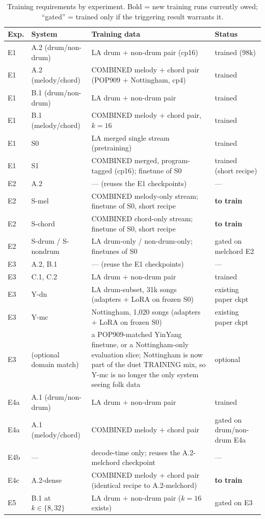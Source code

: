 \documentclass[11pt]{article}
\begin{document}
\begin{table}[ht]
\centering
\small
\begin{tabularx}{\textwidth}{@{}llLl@{}}
\toprule
Exp. & System & Training data & Status \\
\midrule
E1 & A.2 (drum/non-drum) & LA drum $+$ non-drum pair (cp16) & trained (98k) \\
E1 & A.2 (melody/chord) & COMBINED melody $+$ chord pair (POP909 $+$ Nottingham, cp4) & trained \\
E1 & B.1 (drum/non-drum) & LA drum $+$ non-drum pair & trained \\
E1 & B.1 (melody/chord) & COMBINED melody $+$ chord pair, $k{=}16$ & trained \\
E1 & S0 & LA merged single stream (pretraining) & trained \\
E1 & S1 & COMBINED merged, program-tagged (cp16); finetune of S0 & trained (short recipe) \\
\midrule
E2 & A.2 & --- (reuses the E1 checkpoints) & --- \\
E2 & S-mel & COMBINED melody-only stream; finetune of S0, short recipe & \textbf{to train} \\
E2 & S-chord & COMBINED chord-only stream; finetune of S0, short recipe & \textbf{to train} \\
E2 & S-drum / S-nondrum & LA drum-only / non-drum-only; finetunes of S0 & gated on melchord E2 \\
\midrule
E3 & A.2, B.1 & --- (reuse the E1 checkpoints) & --- \\
E3 & C.1, C.2 & LA drum $+$ non-drum pair & trained \\
E3 & Y-dn & LA drum-subset, 31k songs (adapters $+$ LoRA on frozen S0) & existing paper ckpt \\
E3 & Y-mc & Nottingham, 1{,}020 songs (adapters $+$ LoRA on frozen S0) & existing paper ckpt \\
E3 & (optional domain match) & a POP909-matched YinYang finetune, or a Nottingham-only evaluation slice; Nottingham is now part of the duet TRAINING mix, so Y-mc is no longer the only system seeing folk data & optional \\
\midrule
E4a & A.1 (drum/non-drum) & LA drum $+$ non-drum pair & trained \\
E4a & A.1 (melody/chord) & COMBINED melody $+$ chord pair & gated on drum/non-drum E4a \\
E4b & --- & decode-time only; reuses the A.2-melchord checkpoint & --- \\
E4c & A.2-dense & COMBINED melody $+$ chord pair (identical recipe to A.2-melchord) & \textbf{to train} \\
\midrule
E5 & B.1 at $k \in \{8, 32\}$ & LA drum $+$ non-drum pair ($k{=}16$ exists) & gated on E3 \\
\bottomrule
\end{tabularx}
\caption{Training requirements by experiment. Bold = new training
runs currently owed; ``gated'' = trained only if the triggering result
warrants it.}
\label{tab:training-requirements}
\end{table}
\end{document}

